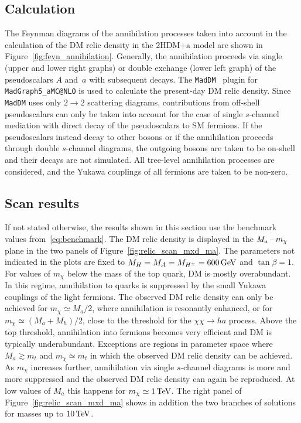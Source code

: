 \documentclass[a4paper, 11pt,notoc]{article}
\newcommand{\mA}{\ensuremath{M_{A}}\xspace}
\newcommand{\ma}{\ensuremath{M_{a}}\xspace}
\newcommand{\mH}{\ensuremath{M_{H}}\xspace}
\newcommand{\mHc}{\ensuremath{M_{H^{\pm}}}\xspace}
\newcommand{\mh}{\ensuremath{M_{h}}\xspace}
\newcommand{\hdma}{\ensuremath{\textrm{2HDM+a}}\xspace}
\begin{document}
\subsection{Calculation}

The Feynman diagrams of the annihilation processes taken into account in the calculation of the DM relic density in the \hdma model are shown in Figure~\ref{fig:feyn_annihilation}. Generally, the annihilation proceeds via single (upper and lower right graphs) or double exchange (lower left graph) of the pseudoscalars  $A$ and~$a$ with subsequent decays. The {\tt MadDM}~\cite{Backovic:2013dpa,Backovic:2015cra} plugin for {\tt MadGraph5\_aMC@NLO} is used to calculate the present-day DM relic density.  Since {\tt MadDM} uses only $2 \to 2$ scattering diagrams, contributions from off-shell pseudoscalars can only be taken into account for the case of single $s$-channel mediation with direct decay of the pseudoscalars to SM fermions. If the pseudoscalars instead decay to other bosons or if the annihilation proceeds through double $s$-channel diagrams, the outgoing bosons are taken to be on-shell and their decays are not simulated. All tree-level annihilation processes are considered, and the Yukawa couplings of all fermions are taken to be non-zero.

\subsection{Scan results}

 If not stated otherwise, the results shown in this section use the benchmark values from~\eqref{eq:benchmark}. The DM relic density is displayed in the $\ma \hspace{0.5mm}$--$\hspace{0.5mm} m_\chi$ plane in the two panels of Figure~\ref{fig:relic_scan_mxd_ma}. The parameters not indicated in the plots are  fixed to  $\mH=\mA=\mHc= 600 \, {\rm GeV}$ and $\tan \beta=1$. For values of $m_\chi$ below the mass of the top quark, DM is mostly overabundant. In this regime, annihilation to quarks is suppressed by the small Yukawa couplings of the light fermions. The observed DM relic density can only be achieved for $m_\chi \simeq \ma/2$, where annihilation is resonantly enhanced, or for $m_\chi \simeq (\ma+\mh)/2$, close to the threshold for the $\chi\chi \to h a$ process.  Above the top threshold, annihilation into fermions becomes very efficient and DM is typically underabundant. Exceptions are regions in parameter space where $M_a \gtrsim m_t$ and $m_\chi \simeq m_t$ in which the observed DM relic density can be achieved.  As $m_\chi$ increases further, annihilation via single $s$-channel diagrams is more and more suppressed and the observed DM relic density can again be reproduced.  At low values of $\ma$ this happens for $m_\chi \simeq 1 \, {\rm TeV}$. The right panel of Figure~\ref{fig:relic_scan_mxd_ma}   shows in addition the two branches of solutions for masses up to $10 \, {\rm TeV}$. 
\end{document}
